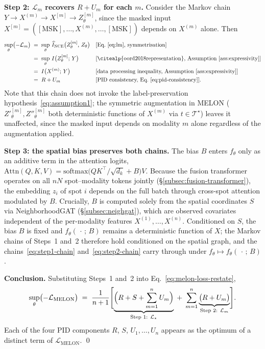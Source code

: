 \documentclass{article}
\theoremstyle{plain}
\theoremstyle{definition}
\begin{document}
\textbf{Step 2: $\mathcal{L}_{m}$ recovers $R + U_m$ for each $m$.}
Consider the Markov chain $Y \to X^{(m)} \to X^{[m]} \to Z^{[m]}_\theta$, since the masked input $X^{[m]} = ([\mathrm{MSK}], \ldots, X^{(m)}, \ldots, [\mathrm{MSK}])$ depends on $X^{(m)}$ alone. Then
\begin{equation}\label{eq:step2-chain}
\begin{aligned}
\sup_{\theta} \bigl(-\mathcal{L}_{m}\bigr)
  \;&=\; \sup_{\theta}\, \widehat{I}_{\mathrm{NCE}}\bigl(Z^{[m]}_\theta,\, Z_\theta\bigr)
    && \text{[Eq.~\eqref{eq:lm}, symmetrisation]} \\
  \;&=\; \sup_{\theta}\, I\bigl(Z^{[m]}_\theta;\, Y\bigr)
    && \text{[\citealp{oord2018representation}, Assumption~\ref{ass:expressivity}]} \\
  \;&=\; I\bigl(X^{(m)};\, Y\bigr)
    && \text{[data processing inequality, Assumption~\ref{ass:expressivity}]} \\
  \;&=\; R + U_m
    && \text{[PID consistency, Eq.~\eqref{eq:pid-consistency}]}.
\end{aligned}
\end{equation}
Note that this chain does not invoke the label-preservation hypothesis~\eqref{eq:assumption1}; the symmetric augmentation in MELON ($Z'^{[m]}_\theta, Z''^{[m]}_\theta$ both deterministic functions of $X^{(m)}$ via $t \in \mathcal{T}^\star$) leaves it unaffected, since the masked input depends on modality $m$ alone regardless of the augmentation applied.

\textbf{Step 3: the spatial bias preserves both chains.}
The bias $B$ enters $f_\theta$ only as an additive term in the attention logits, $\mathrm{Attn}(Q, K, V) = \mathrm{softmax}\bigl(QK^\top/\sqrt{d_k} + B\bigr)V$. Because the fusion transformer operates on all $nN$ spot--modality tokens jointly (\S\ref{subsec:fusion-transformer}), the embedding $z_i$ of spot $i$ depends on the full batch through cross-spot attention modulated by $B$. Crucially, $B$ is computed solely from the spatial coordinates $S$ via NeighborhoodGAT (\S\ref{subsec:neighgat}), which are observed covariates independent of the per-modality features $X^{(1)}, \ldots, X^{(n)}$. Conditioned on $S$, the bias $B$ is fixed and $f_\theta(\,\cdot\,;\, B)$ remains a deterministic function of $X$; the Markov chains of Steps~1 and~2 therefore hold conditioned on the spatial graph, and the chains~\eqref{eq:step1-chain} and~\eqref{eq:step2-chain} carry through under $f_\theta \mapsto f_\theta(\,\cdot\,;\, B)$.

\textbf{Conclusion.} Substituting Steps~1 and~2 into Eq.~\eqref{eq:melon-loss-restate},
\begin{equation}\label{eq:final}
\sup_{\theta} \bigl(-\mathcal{L}_{\mathrm{MELON}}\bigr)
  \;=\; \frac{1}{n+1}\Biggl[
    \underbrace{\Bigl(R + S + \sum_{m=1}^{n} U_m\Bigr)}_{\text{Step 1: } \mathcal{L}_{\star}}
    \;+\;
    \sum_{m=1}^{n} \underbrace{\bigl(R + U_m\bigr)}_{\text{Step 2: } \mathcal{L}_{m}}
  \Biggr].
\end{equation}
Each of the four PID components $R$, $S$, $U_1, \ldots, U_n$ appears as the optimum of a distinct term of $\mathcal{L}_{\mathrm{MELON}}$. \qed
\end{document}

